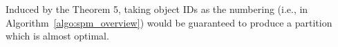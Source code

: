 Induced by the Theorem 5, taking object IDs as the numbering (i.e., in Algorithm~\ref{algo:spm_overview})
would be guaranteed to produce a partition which is almost optimal.
%
%



